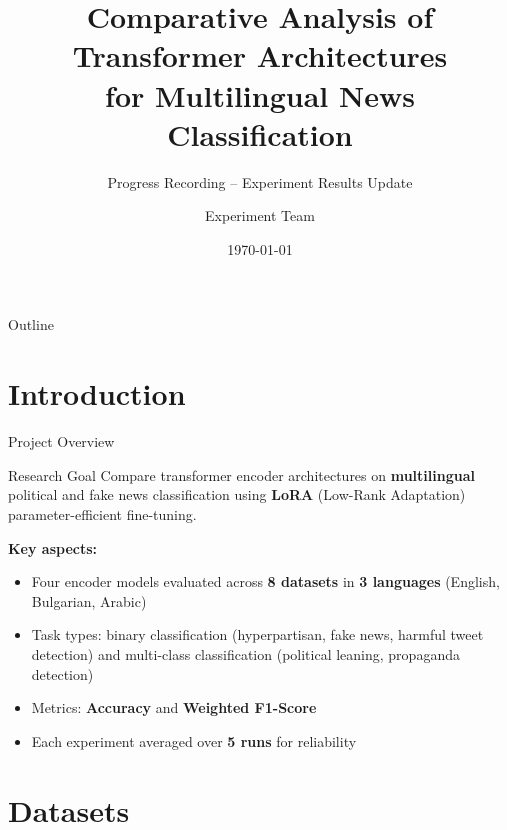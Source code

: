 \documentclass[aspectratio=169]{beamer}
\title[Progress Report]{Comparative Analysis of Transformer Architectures\\for Multilingual News Classification}
\subtitle{Progress Recording -- Experiment Results Update}
\author{Experiment Team}
\institute{Supervised Fine-Tuning with LoRA Adapters}
\date{\today}
\begin{document}
\begin{frame}
  \titlepage
\end{frame}

\begin{frame}{Outline}
  \tableofcontents
\end{frame}

\section{Introduction}

\begin{frame}{Project Overview}
  \begin{block}{Research Goal}
    Compare transformer encoder architectures on \textbf{multilingual} political
    and fake news classification using \textbf{LoRA} (Low-Rank Adaptation)
    parameter-efficient fine-tuning.
  \end{block}

  \vspace{0.3cm}
  \textbf{Key aspects:}
  \begin{itemize}
    \item Four encoder models evaluated across \textbf{8 datasets} in \textbf{3 languages} (English, Bulgarian, Arabic)
    \item Task types: binary classification (hyperpartisan, fake news, harmful tweet detection) and multi-class classification (political leaning, propaganda detection)
    \item Metrics: \textbf{Accuracy} and \textbf{Weighted F1-Score}
    \item Each experiment averaged over \textbf{5 runs} for reliability
  \end{itemize}
\end{frame}

\section{Datasets}
\end{document}
